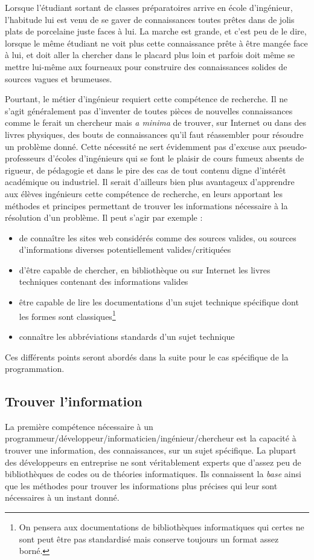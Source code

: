 \documentclass[../../../main.tex]{subfiles}
\begin{document}
Lorsque l'étudiant sortant de classes préparatoires arrive en école d'ingénieur, l'habitude lui est venu de se gaver de connaissances toutes prêtes dans de jolis plats de porcelaine juste faces à lui. La marche est grande, et c'est peu de le dire, lorsque le même étudiant ne voit plus cette connaissance prête à être mangée face à lui, et doit aller la chercher dans le placard plus loin et parfois doit même se mettre lui-même aux fourneaux pour construire des connaissances solides de sources vagues et brumeuses.

Pourtant, le métier d'ingénieur requiert cette compétence de recherche. Il ne s'agit généralement pas d'inventer de toutes pièces de nouvelles connaissances comme le ferait un chercheur mais \textit{a minima} de trouver, sur Internet ou dans des livres physiques, des bouts de connaissances qu'il faut réassembler pour résoudre un problème donné. Cette nécessité ne sert évidemment pas d'excuse aux pseudo-professeurs d'écoles d'ingénieurs qui se font le plaisir de cours fumeux absents de rigueur, de pédagogie et dans le pire des cas de tout contenu digne d'intérêt académique ou industriel. Il serait d'ailleurs bien plus avantageux d'apprendre aux élèves ingénieurs cette compétence de recherche, en leurs apportant les méthodes et principes permettant de trouver les informations nécessaire à la résolution d'un problème. Il peut s'agir par exemple :
\begin{itemize}
	\item de connaître les sites web considérés comme des sources valides, ou sources d'informations diverses potentiellement valides/critiquées
	\item d'être capable de chercher, en bibliothèque ou sur Internet les livres techniques contenant des informations valides
	\item être capable de lire les documentations d'un sujet technique spécifique dont les formes sont classiques\footnote{On pensera aux documentations de bibliothèques informatiques qui certes ne sont peut être pas standardisé mais conserve toujours un format assez borné.}
	\item connaître les abbréviations standards d'un sujet technique
\end{itemize}
Ces différents points seront abordés dans la suite pour le cas spécifique de la programmation.
\subsection{Trouver l'information}
La première compétence nécessaire à un programmeur/développeur/informaticien/ingénieur/chercheur est la capacité à trouver une information, des connaissances, sur un sujet spécifique. La plupart des développeurs en entreprise ne sont véritablement experts que d'assez peu de bibliothèques de codes ou de théories informatiques. Ils connaissent la \textit{base} ainsi que les méthodes pour trouver les informations plus précises qui leur sont nécessaires à un instant donné.
\end{document}
